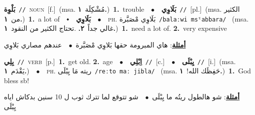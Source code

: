 \documentclass[10pt,a4paper,twoside]{article} %
\begin{document}
\begin{multicols}{2}
{\setlength\topsep{0pt}\textbf{\foreignlanguage{arabic}{بَلْوِة}}\ {\color{gray}\texttt{//}\color{black}}\ \textsc{noun}\ [f.]\ \color{gray}(msa. \foreignlanguage{arabic}{مُشْكِلَة}~\foreignlanguage{arabic}{\textbf{١.}})\color{black}\ \textbf{1.}~trouble\ \ $\bullet$\ \ \setlength\topsep{0pt}\textbf{\foreignlanguage{arabic}{بَلَاوِي}}\ {\color{gray}\texttt{//}\color{black}}\ [pl.]\ \color{gray}(msa. \foreignlanguage{arabic}{الكثير من}~\foreignlanguage{arabic}{\textbf{١.}})\color{black}\ \textbf{1.}~a lot of\ \ $\smblkdiamond$\ \ \setlength\topsep{0pt}\textbf{\foreignlanguage{arabic}{بَلَاوِي}}\ \ $\bullet$\ \ \textsc{ph.} \color{gray} \foreignlanguage{arabic}{بَلَاوِي مْصَبَّرة}\color{black}\ {\color{gray}\texttt{/{\sffamily balaːwi msˤabbara}/}\color{black}}\ \color{gray} (msa. \foreignlanguage{arabic}{غالي جداً}~\foreignlanguage{arabic}{\textbf{٢.}}  .\foreignlanguage{arabic}{تحتاج الكثير من النقود}~\foreignlanguage{arabic}{\textbf{١.}})\color{black}\ \textbf{1.}~need a lot of.  \textbf{2.}~very expensive\  \begin{flushright}\color{gray}\foreignlanguage{arabic}{\textbf{\underline{\foreignlanguage{arabic}{أمثلة}}}: هاي المبرومة حقها بَلاوِي مْصَبَّرة\ $\bullet$\ \  عندهم مصاري بَلاوِي}\end{flushright}\color{black}} \vspace{2mm}

{\setlength\topsep{0pt}\textbf{\foreignlanguage{arabic}{بِلِي}}\ {\color{gray}\texttt{//}\color{black}}\ \textsc{verb}\ [p.]\ \textbf{1.}~get old.  \textbf{2.}~age\ \ $\bullet$\ \ \setlength\topsep{0pt}\textbf{\foreignlanguage{arabic}{اِبْلِي}}\ {\color{gray}\texttt{//}\color{black}}\ [c.]\ \ $\bullet$\ \ \setlength\topsep{0pt}\textbf{\foreignlanguage{arabic}{يِبْلَى}}\ {\color{gray}\texttt{//}\color{black}}\ [i.]\ \color{gray}(msa. \foreignlanguage{arabic}{يَقْدَم}~\foreignlanguage{arabic}{\textbf{١.}})\color{black}\ \ $\bullet$\ \ \textsc{ph.} \color{gray} \foreignlanguage{arabic}{ريته مَا يِبْلَى}\color{black}\ {\color{gray}\texttt{/{\sffamily reːto maː jibla}/}\color{black}}\ \color{gray} (msa. \foreignlanguage{arabic}{حَفِظَك الله!}~\foreignlanguage{arabic}{\textbf{١.}})\color{black}\ \textbf{1.}~God bless sb!\  \begin{flushright}\color{gray}\foreignlanguage{arabic}{\textbf{\underline{\foreignlanguage{arabic}{أمثلة}}}: شو هالطول ريتُه ما يِبْلَى\ $\bullet$\ \  شو تتوقع لما تترك ثوب ل 10 سنين بدكاش اياه يِبْلَى}\end{flushright}\color{black}} \vspace{2mm}


\end{multicols}
\end{document}
